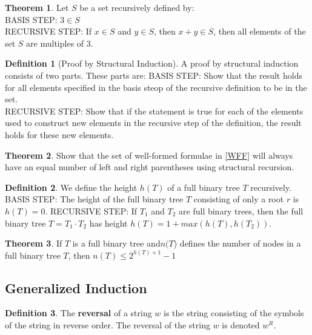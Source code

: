 \documentclass[11pt]{book} %
\theoremstyle {definition}
\newtheorem {definition}{Definition}[section]
\newtheorem {theorem}{Theorem}[section]
\theoremstyle {remark}
\begin{document}
\begin{theorem}
Let $S$ be a set recursively defined by:\\
BASIS STEP: $3 \in S$ \\
RECURSIVE STEP: If $x \in S$ and $y\in S$, then $x+y \in S$,
then all elements of the set $S$ are multiples of 3.
\end{theorem}

\begin{definition} [Proof by Structural Induction]
A proof by structural induction consists of two parts. These parts are:
BASIS STEP: Show that the result holds for all elements specified in the basis steop of the recursive definition to be in the set. \\
RECURSIVE STEP: Show that if the statement is true for each of the elements used to construct new elements in the recursive step of the definition, the result holds for these new elements.
\end{definition}
 
\begin{theorem}
Show that the set of well-formed formulae in \ref{WFF} will always have an equal number of left and right parentheses using structural recursion.
\end{theorem}



\begin{definition}
We define the height $h(T)$ of a full binary tree $T$ recursively.\\
BASIS STEP: The height of the full binary tree $T$ consisting of only a root $r$ is $h(T)=0$.
RECURSIVE STEP:  If $T_1$ and $T_2$ are full binary trees, then the full binary tree $T=T_1 \cdot T_2$ has height $h(T)=1 + max(h(T), h(T_2))$.
\end{definition}

\begin{theorem}
If $T$ is a full binary tree and$ n(T$) defines the number of nodes in a full binary tree $T$, then $n(T) \le 2^{h(T)+1} -1$
\end{theorem}

  \subsection {Generalized Induction}
\begin{definition}
The \textbf{reversal} of a string $w$ is the string consisting of the symbols of the string in reverse order. The reversal of the string $w$ is denoted $w^R$.
\end{definition}
\end{document}

